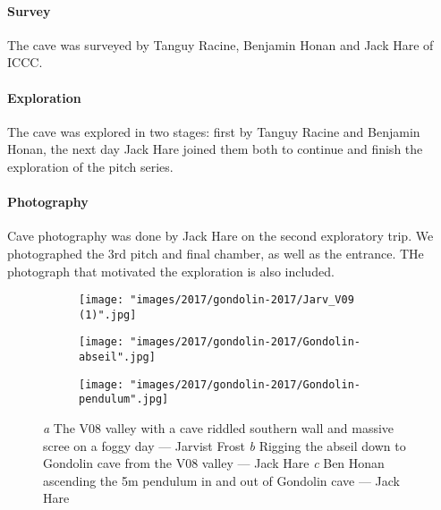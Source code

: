 \documentclass[symmetric, a4paper, 11pt]{article}
\begin{document}
\paragraph{Survey} The cave was surveyed by Tanguy Racine, Benjamin Honan and Jack Hare of ICCC. 

\paragraph{Exploration} The cave was explored in two stages: first by Tanguy Racine and Benjamin Honan, the next day Jack Hare joined them both to continue and finish the exploration of the pitch series.

\paragraph{Photography} Cave photography was done by Jack Hare on the second exploratory trip. We photographed the 3rd pitch and final chamber, as well as the entrance. THe photograph that motivated the exploration is also included.

\begin{figure}[t!]

\centering
    \begin{subfigure}[t]{0.52\textwidth}
        \centering
         \texttt{[image: "images/2017/gondolin-2017/Jarv\_V09 (1)".jpg]}
        
        \caption{} \label{V08 valley}
    \end{subfigure}
    \hfill
    \begin{subfigure}[t]{0.46\textwidth}
    \centering
        \texttt{[image: "images/2017/gondolin-2017/Gondolin-abseil".jpg]}
        \caption{} \label{gondolin abseil}
    \end{subfigure}
    \begin{subfigure}{\textwidth}
    \centering
        \texttt{[image: "images/2017/gondolin-2017/Gondolin-pendulum".jpg]}
        \caption{} \label{gondolin pendulum}
\end{subfigure}
    \caption{
    \emph{a} The V08 valley with a cave riddled southern wall and massive scree on a foggy day --- Jarvist Frost
    \emph{b} Rigging the abseil down to Gondolin cave from the V08 valley --- Jack Hare
    \emph{c} Ben Honan ascending the 5m pendulum in and out of Gondolin cave --- Jack Hare  }
\end{figure}
\end{document}
